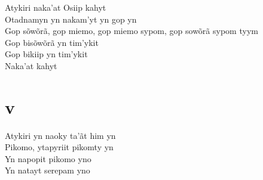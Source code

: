 \begin{linenumbers}
 
\noindent   Atykiri naka'at Osiip kahyt\\
  Otadnamyn yn nakam'yt yn gop yn\\
  Gop sõwõrã, gop miemo, gop miemo sypom, gop sowõrã sypom tyym\\
  Gop bisõwõrã yn tim'ykit\\
  Gop bikiip yn tim'ykit\\
  Naka'at kahyt
 
 
\medskip
\section{v}

  \noindent Atykiri yn naoky ta'ãt him yn\\
  Pikomo, ytapyriit pikomty yn\\
  Yn napopit pikomo yno\\
  Yn natayt serepam yno
 
\end{linenumbers}

\bigskip


